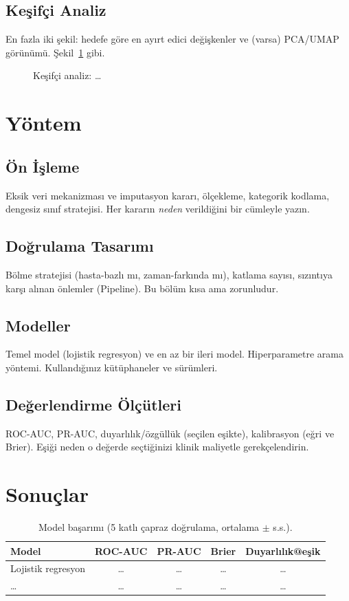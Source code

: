 \documentclass[11pt,a4paper]{article}
\begin{document}
\subsection{Keşifçi Analiz}
En fazla iki şekil: hedefe göre en ayırt edici değişkenler ve (varsa) PCA/UMAP görünümü. Şekil~\ref{fig:eda} gibi.

\begin{figure}[H]
\centering
\caption{Keşifçi analiz: \ldots}
\label{fig:eda}
\end{figure}

\section{Yöntem}
\subsection{Ön İşleme}
Eksik veri mekanizması ve imputasyon kararı, ölçekleme, kategorik kodlama, dengesiz sınıf stratejisi. Her kararın \emph{neden} verildiğini bir cümleyle yazın.

\subsection{Doğrulama Tasarımı}
Bölme stratejisi (hasta-bazlı mı, zaman-farkında mı), katlama sayısı, sızıntıya karşı alınan önlemler (Pipeline). Bu bölüm kısa ama zorunludur.

\subsection{Modeller}
Temel model (lojistik regresyon) ve en az bir ileri model. Hiperparametre arama yöntemi. Kullandığınız kütüphaneler ve sürümleri.

\subsection{Değerlendirme Ölçütleri}
ROC-AUC, PR-AUC, duyarlılık/özgüllük (seçilen eşikte), kalibrasyon (eğri ve Brier). Eşiği neden o değerde seçtiğinizi klinik maliyetle gerekçelendirin.

\section{Sonuçlar}
\begin{table}[H]
\centering
\caption{Model başarımı (5 katlı çapraz doğrulama, ortalama $\pm$ s.s.).}
\label{tab:sonuc}
\begin{tabular}{lcccc}
\toprule
Model & ROC-AUC & PR-AUC & Brier & Duyarlılık@eşik \\
\midrule
Lojistik regresyon & \ldots & \ldots & \ldots & \ldots \\
\ldots & \ldots & \ldots & \ldots & \ldots \\
\bottomrule
\end{tabular}
\end{table}
\end{document}
